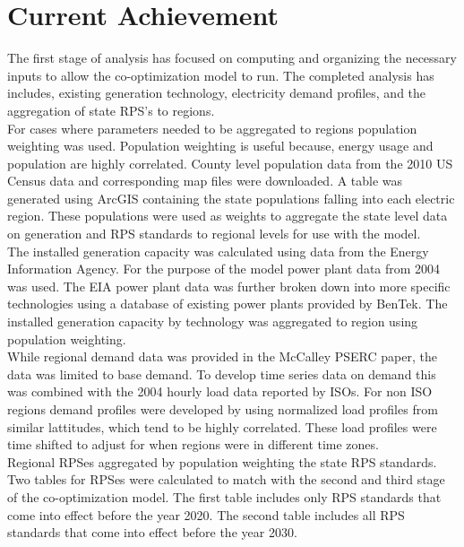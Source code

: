 \documentclass[oneside,12pt]{report}
\begin{document}
\chapter{Current Achievement}
The first stage of analysis has focused on computing and organizing the necessary inputs to allow the co-optimization model to run. The completed analysis has includes, existing generation technology, electricity demand profiles, and the aggregation of state RPS's to regions. 
\\For cases where parameters needed to be aggregated to regions population weighting was used. Population weighting is useful because, energy usage and population are highly correlated. County level population data from the 2010 US Census data and corresponding map files were downloaded. A table was generated using ArcGIS containing the state populations falling into each electric region. These populations were used as weights to aggregate the state level data on generation and RPS standards to regional levels for use with the model.
\\The installed generation capacity was calculated using data from the Energy Information Agency. For the purpose of the model power plant data from 2004 was used. The EIA power plant data was further broken down into more specific technologies using a database of existing power plants provided by BenTek. The installed generation capacity by technology was aggregated to region using population weighting.
\\While regional demand data was provided in the McCalley PSERC paper, the data was limited to base demand. To develop time series data on demand this was combined with the 2004 hourly load data reported by ISOs. For non ISO regions demand profiles were developed by using normalized load profiles from similar lattitudes, which tend to be highly correlated. These load profiles were time shifted to adjust for  when regions were in different time zones.
\\Regional RPSes aggregated by population weighting the state RPS standards. Two tables for RPSes were calculated to match with the second and third stage of the co-optimization model. The first table includes only RPS standards that come into effect before the year 2020. The second table includes all RPS standards that come into effect before the year 2030.
\end{document}
